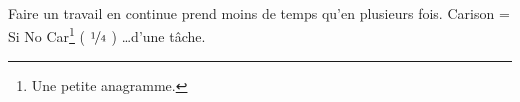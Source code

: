 %
    {Faire un travail en continue prend moins de temps qu’en plusieurs fois.}%
    {Carison = Si No Car\footnote{Une petite anagramme.} ( $\nicefrac14$ ) \dots d'une tâche.}
